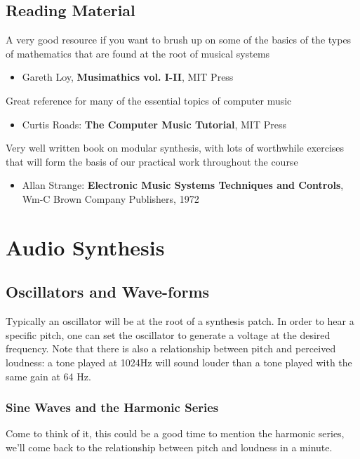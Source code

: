 \documentclass[11pt]{article}
\begin{document}
\subsection{Reading Material}
\label{sec:org39a6ebc}

A very good resource if you want to brush up on some of the basics of the types of mathematics that are found at the root of musical systems
\begin{itemize}
\item Gareth Loy, \textbf{Musimathics vol. I-II}, MIT Press
\end{itemize}

Great reference for many of the essential topics of computer music
\begin{itemize}
\item Curtis Roads: \textbf{The Computer Music Tutorial}, MIT Press
\end{itemize}

Very well written book on modular synthesis, with lots of worthwhile exercises that will form the basis of our practical work throughout the course
\begin{itemize}
\item Allan Strange: \textbf{Electronic Music Systems Techniques and Controls}, Wm-C Brown Company Publishers, 1972
\end{itemize}

\section{Audio Synthesis}
\label{sec:org5bfddf6}
\subsection{Oscillators and Wave-forms}
\label{sec:org3463fcc}
Typically an oscillator will be at the root of a synthesis patch. 
In order to hear a specific pitch, one can set the oscillator to 
generate a voltage at the desired frequency.  
Note that there is also a relationship between pitch and perceived 
loudness: a tone played at 1024Hz will sound louder than a tone played with the same gain at 64 Hz.

\subsubsection{Sine Waves and the Harmonic Series}
\label{sec:org5e071cd}
Come to think of it, this could be a good time to mention the harmonic
series, we'll come back to the relationship between pitch and loudness
in a minute. 
\end{document}
